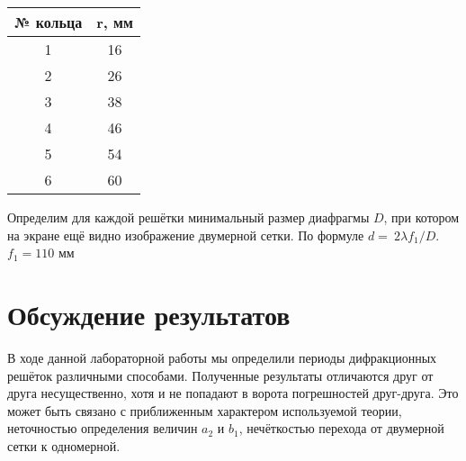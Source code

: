 \documentclass{article}
\begin{document}
\begin{table}[h]
  \begin{center}
  \begin{tabular}{|c|c|}
  \hline
   № кольца &  r, мм \\
  \hline
   1 & 16 \\  \hline
   2 & 26 \\ \hline
   3 & 38 \\ \hline
   4 & 46 \\ \hline
   5 & 54 \\ \hline
   6 & 60 \\ \hline
  
  
   
  \end{tabular}

  Определим для каждой решётки минимальный размер диафрагмы $D$, при котором на экране ещё видно изображение двумерной сетки. По формуле $d =~2\lambda f_1 / D$. $f_1 = 110$ мм


    
      
    
        
    
    
      
      
      
      
        
    
    
    \section {Обсуждение результатов}
      В ходе данной лабораторной работы мы определили периоды дифракционных решёток различными способами. Полученные результаты отличаются друг от друга несущественно, хотя и не попадают в ворота погрешностей друг-друга. Это может быть связано с приближенным характером используемой теории, неточностью определения величин $a_2$ и $b_1$, нечёткостью перехода от двумерной сетки к одномерной. 
      

\end{center}
\end{table}
\end{document}
